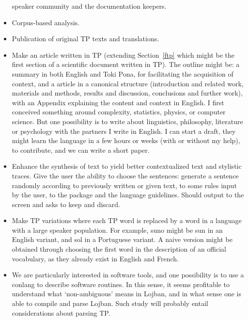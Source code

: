 \begin{itemize}
    speaker community and the documentation keepers.
  \item Corpus-based analysis.
  \item Publication of original TP texts and translations.
  \item Make an article written in TP
    (extending Section~\ref{ftp} which might be the
    first section of a scientific document written in TP).
    The outline might be:
    a summary in both English and Toki Pona, for
    facilitating the acquisition of context,
    and a article in a canonical structure
    (introduction and related work, materials and methods,
    results and discussion, conclusions and further work),
    with an Appendix explaining the content and context in English.
    I first conceived something around complexity, statistics, physics, or computer science.
    But one possibility is to write about linguistics, philosophy, literature
    or psychology with the partners I write in English.
    I can start a draft,
    they might learn the language in a few hours or weeks
    (with or without my help),
    to contribute, and we can write a short paper.
  \item Enhance the synthesis of text to yield better contextualized text
    and stylistic traces.
    Give the user the ability to choose the sentences:
    generate a sentence randomly according to
    previously written or given text,
    to some rules input by the user,
    to the package and the language guidelines.
    Should output to the screen and asks to keep and discard.
  \item Make TP variations where each TP word is replaced by a word in
    a language with a large speaker population. 
For example,
suno might be sun in an English variant,
and sol in a Portuguese variant.
A naive version might be obtained through
choosing the first word in the description of
an official vocabulary, as they already exist in English and French.
  \item We are particularly interested in software tools,
    and one possibility is to use a conlang to describe software
    routines.
    In this sense, it seems profitable
    to understand what `non-ambiguous' means in Lojban,
    and in what sense one is able to compile and parse Lojban.
    Such study will probably entail considerations about
    parsing TP.
\end{itemize}

